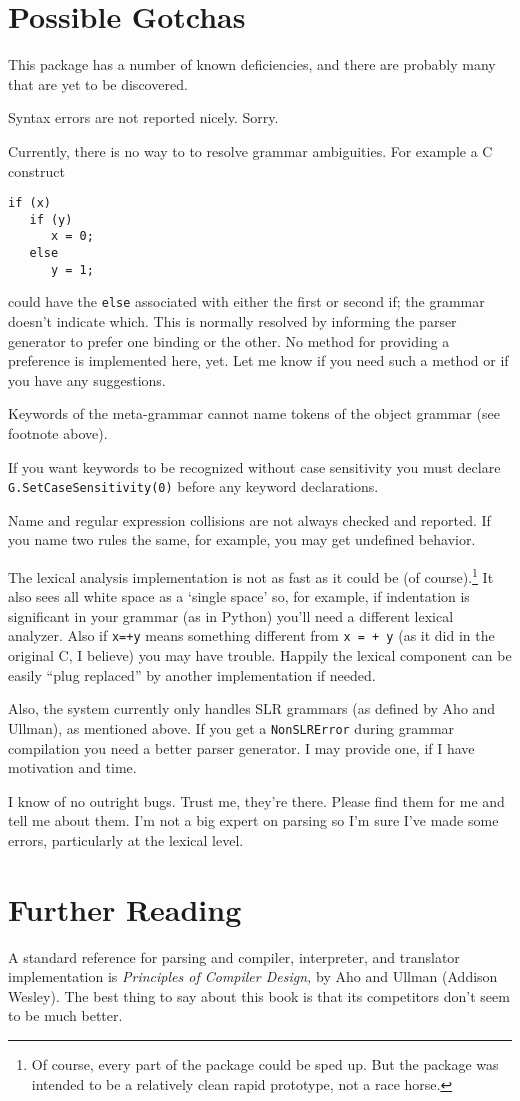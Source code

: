\section{Possible Gotchas}

This package has a number of known deficiencies, and there
are probably many that are yet to be discovered.

Syntax errors are not reported nicely.  Sorry.

Currently, there is no way to to resolve grammar
ambiguities.  For example a C construct
\begin{verbatim}
if (x)
   if (y)
      x = 0;
   else
      y = 1;
\end{verbatim}
could have the {\tt else} associated with either the
first or second if; the grammar doesn't indicate which.  
This is normally resolved by informing
the parser generator to prefer one binding or the other.
No method for providing a preference is implemented here, yet.
Let me know if you need such a method or if you have any suggestions.

Keywords of the meta-grammar cannot name tokens of
the object grammar (see footnote above).

If you want keywords to be recognized without case
sensitivity you must declare {\tt G.SetCaseSensitivity(0)}
before any keyword declarations.

Name and regular expression collisions are not always
checked and reported.  If you name two rules the same,
for example, you may get undefined behavior.

The lexical analysis implementation is not as fast as it
could be (of course).\footnote{Of course,
every part of the package could be sped up. But
the package was intended to be a relatively clean
rapid prototype, not a race horse.}
It also sees all white space as a
`single space'
so, for example, if indentation is significant in your grammar
(as in Python) you'll need a different lexical analyzer.
Also if {\tt x=+y} means something different from 
{\tt x = + y} (as it did in the original C, I believe)
you may have trouble.  Happily the lexical component can
be easily ``plug replaced'' by another implementation if needed.

Also, the system currently only handles SLR grammars (as defined
by Aho and Ullman), as mentioned above.  If you get a
{\tt NonSLRError} during grammar compilation you need a better
parser generator.  I may provide one, if I have motivation and time.

I know of no outright bugs.  Trust me, they're there.  Please
find them for me and tell me about them.  I'm not a big
expert on parsing so I'm sure I've made some errors, particularly
at the lexical level.

\section{Further Reading}

A standard reference for parsing and compiler, interpreter,
and translator implementation is {\em Principles of Compiler
Design,} by Aho and Ullman (Addison Wesley).  The best thing
to say about this book is that its competitors don't seem to
be much better.


